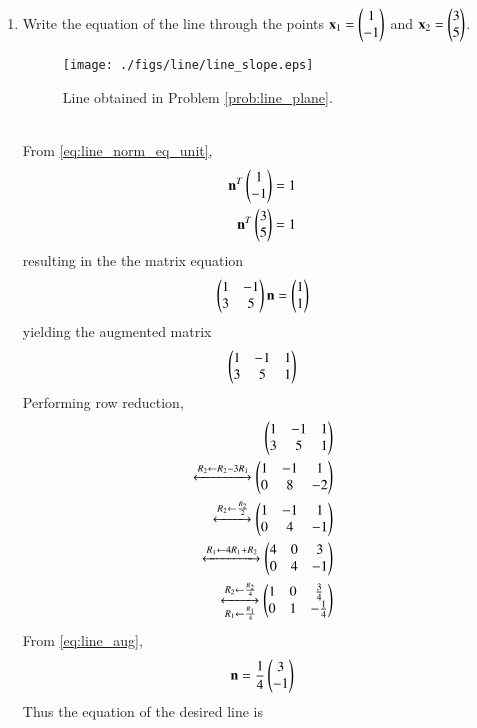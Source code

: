 \begin{enumerate}[label=\thesubsection.\arabic*.,ref=\thesubsection.\theenumi]
\item  Write the equation of the line through the points $\mathbf{x}_1=\begin{pmatrix}1\\-1\end{pmatrix}$ and $\mathbf{x}_2 = \begin{pmatrix}3\\5\end{pmatrix}$. 
\label{prob:line_plane}
\begin{figure}
\centering
\texttt{[image: ./figs/line/line\_slope.eps]}
\caption{ Line obtained in Problem 
\ref{prob:line_plane}.}
\label{fig:line_plane}
\end{figure}
\\
\solution 
 From \eqref{eq:line_norm_eq_unit},  
\begin{align}
\mathbf{n}^T\begin{pmatrix}1 \\ -1\end{pmatrix} &= 1
\\
\mathbf{n}^T\begin{pmatrix} 3 \\ 5\end{pmatrix}  &= 1
\end{align}
%
resulting in the the matrix equation
\begin{align}
\begin{pmatrix}1 & -1 \\ 3 & 5\end{pmatrix} \mathbf{n} = \begin{pmatrix}1 \\ 1\end{pmatrix}
\end{align}
yielding the augmented matrix
\begin{align}
\begin{pmatrix}1 & -1 & 1 \\ 3 & 5 & 1\end{pmatrix} 
\end{align}
Performing row reduction,
\begin{align}
\begin{pmatrix}1 & -1 & 1 \\ 3 & 5 & 1\end{pmatrix} 
\\
\xleftrightarrow {R_2\leftarrow R_2 -3R_1}\begin{pmatrix}1 & -1 & 1\\0 & 8 & -2\end{pmatrix} 
\\
\xleftrightarrow {R_2\leftarrow \frac{R_2}{2}}\begin{pmatrix}1 & -1 & 1\\0 & 4 & -1\end{pmatrix} 
\\
\xleftrightarrow {R_1\leftarrow 4R_1+R_2}\begin{pmatrix}4 & 0 & 3\\0 & 4 & -1\end{pmatrix} 
\\
\xleftrightarrow [R_1\leftarrow\frac{R_1}{4}]{R_2\leftarrow \frac{R_2}{4}}\begin{pmatrix}1 & 0 & \frac{3}{4}\\0 & 1 & -\frac{1}{4}\end{pmatrix} 
\label{eq:line_aug}
\end{align}
From \eqref{eq:line_aug},
\begin{align}
\mathbf{n} = \frac{1}{4}\begin{pmatrix}3 \\-1\end{pmatrix}
\end{align}
%
Thus the equation of the desired line is 
\begin{align}

\end{align}
\end{enumerate}

